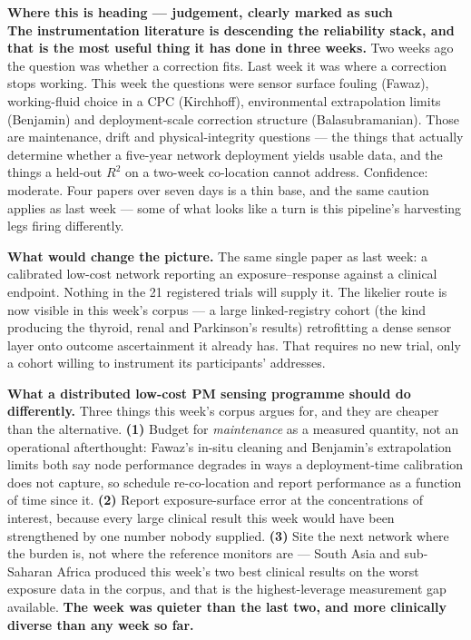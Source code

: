 \documentclass[10pt]{article}
\begin{document}
\vspace{3mm}
\begin{keybox}
{\sffamily\bfseries\footnotesize\color{Deep}Where this is heading --- judgement, clearly
marked as such}\\[1.2mm]
\footnotesize
\textbf{The instrumentation literature is descending the reliability stack, and that is
the most useful thing it has done in three weeks.} Two weeks ago the question was whether
a correction fits. Last week it was where a correction stops working. This week the
questions were sensor surface fouling (Fawaz), working-fluid choice in a CPC (Kirchhoff),
environmental extrapolation limits (Benjamin) and deployment-scale correction structure
(Balasubramanian). Those are maintenance, drift and physical-integrity questions --- the
things that actually determine whether a five-year network deployment yields usable data,
and the things a held-out $R^2$ on a two-week co-location cannot address. Confidence:
moderate. Four papers over seven days is a thin base, and the same caution applies as
last week --- some of what looks like a turn is this pipeline's harvesting legs firing
differently.

\vspace{1.4mm}
\textbf{What would change the picture.} The same single paper as last week: a calibrated
low-cost network reporting an exposure--response against a clinical endpoint. Nothing in
the 21 registered trials will supply it. The likelier route is now visible in this week's
corpus --- a large linked-registry cohort (the kind producing the thyroid, renal and
Parkinson's results) retrofitting a dense sensor layer onto outcome ascertainment it
already has. That requires no new trial, only a cohort willing to instrument its
participants' addresses.

\vspace{1.4mm}
\textbf{What a distributed low-cost PM sensing programme should do differently.} Three
things this week's corpus argues for, and they are cheaper than the alternative.
\textbf{(1)} Budget for \emph{maintenance} as a measured quantity, not an operational
afterthought: Fawaz's in-situ cleaning and Benjamin's extrapolation limits both say node
performance degrades in ways a deployment-time calibration does not capture, so schedule
re-co-location and report performance as a function of time since it. \textbf{(2)} Report
exposure-surface error at the concentrations of interest, because every large clinical
result this week would have been strengthened by one number nobody supplied. \textbf{(3)}
Site the next network where the burden is, not where the reference monitors are --- South
Asia and sub-Saharan Africa produced this week's two best clinical results on the worst
exposure data in the corpus, and that is the highest-leverage measurement gap available.
\textbf{The week was quieter than the last two, and more clinically diverse than any week
so far.}
\end{keybox}
\end{document}
